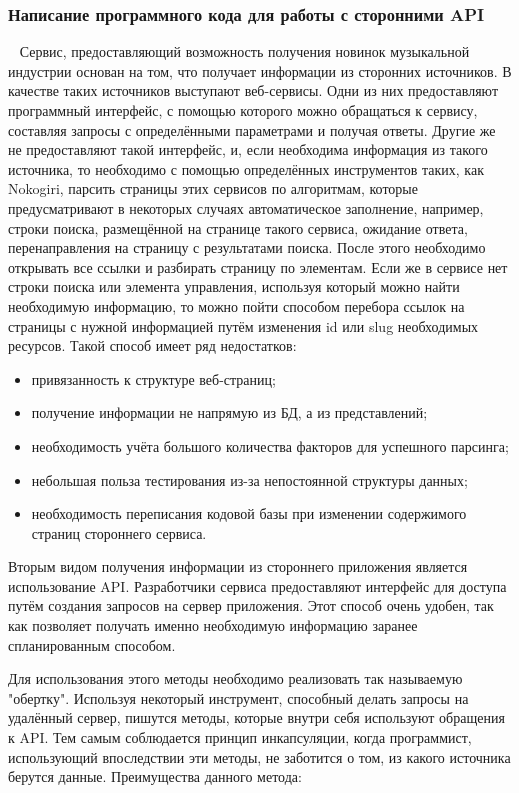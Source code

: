 \subsubsection{Написание программного кода для работы с сторонними API}
\label{sub:arch_and_mod:mvc:controller}
~\newline
\indent Сервис, предоставляющий возможность получения новинок музыкальной индустрии основан на том, что получает информации из сторонних источников. В качестве таких источников выступают веб-сервисы. Одни из них предоставляют программный интерфейс, с помощью которого можно обращаться к сервису, составляя запросы с определёнными параметрами и получая ответы. Другие же не предоставляют такой интерфейс, и, если необходима информация из такого источника, то необходимо с помощью определённых инструментов таких, как Nokogiri, парсить страницы этих сервисов по алгоритмам, которые предусматривают в некоторых случаях автоматическое заполнение, например, строки поиска, размещённой на странице такого сервиса, ожидание ответа, перенаправления на страницу с результатами поиска. После этого необходимо открывать все ссылки и разбирать страницу по элементам. Если же в сервисе нет строки поиска или элемента управления, используя который можно найти необходимую информацию, то можно пойти способом перебора ссылок на страницы с нужной информацией путём изменения id или slug необходимых ресурсов. Такой способ имеет ряд недостатков:

\begin{itemize}
  \item привязанность к структуре веб-страниц;
  \item получение информации не напрямую из БД, а из представлений;
  \item необходимость учёта большого количества факторов для успешного парсинга;
  \item небольшая польза тестирования из-за непостоянной структуры данных;
  \item необходимость переписания кодовой базы при изменении содержимого страниц стороннего сервиса.
\end{itemize}

Вторым видом получения информации из стороннего приложения является использование API. Разработчики сервиса предоставляют интерфейс для доступа путём создания запросов на сервер приложения. Этот способ очень удобен, так как позволяет получать именно необходимую информацию заранее спланированным способом.

Для использования этого методы необходимо реализовать так называемую "обертку". Используя некоторый инструмент, способный делать запросы на удалённый сервер, пишутся методы, которые внутри себя используют обращения к API. Тем самым соблюдается принцип инкапсуляции, когда программист, использующий впоследствии эти методы, не заботится о том, из какого источника берутся данные. Преимущества данного метода:

